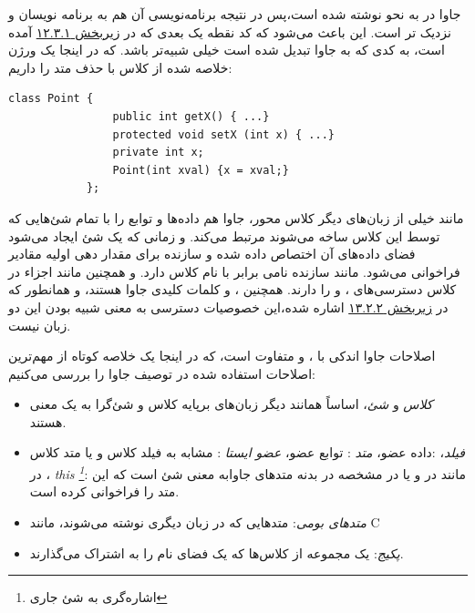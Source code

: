 \documentclass[a4paper,12pt]{report}
\newcommand{\lrm}[1]{{\color{steelBlue}\lr{\texttt{#1}}}}
\begin{document}
 	جاوا در به نحو 
 	نوشته شده است،‌پس در نتیجه برنامه‌نویسی آن هم به برنامه نویسان 
 	 و 
 	نزدیک تر است. این باعث می‌شود که کد نقطه یک بعدی که در 
 	\hyperref[subsec1:sec3:chap12]{
	زیربخش ۱۲.۳.۱} آمده است، به کدی که به جاوا تبدیل شده است خیلی شبیه‌تر باشد. که در اینجا یک ورژن خلاصه شده از کلاس با حذف متد 
 	را داریم:
 		
	\begin{latin}
		\small
		\begin{lstlisting}[]
			class Point {
				public int getX() { ...}
				protected void setX (int x) { ...}
				private int x;
				Point(int xval) {x = xval;}
			};		
		\end{lstlisting}
	\end{latin}	
			
	مانند خیلی از زبان‌های دیگر کلاس محور، جاوا هم داده‌ها و توابع را با تمام شئ‌هایی که توسط این کلاس ساخه می‌شوند مرتبط می‌کند. و زمانی که یک شئ ایجاد می‌شود فضای داده‌های آن اختصاص داده شده و سازنده برای مقدار دهی اولیه مقادیر فراخوانی می‌شود. مانند 
	سازنده نامی برابر با نام  کلاس دارد. و همچنین مانند 
	اجزاء در کلاس 
	 ‌دسترسی‌های
	،  و 
	 را دارند.
	  همچنین
	،  و 
		کلمات کلیدی جاوا هستند، و همانطور که در 
	\linebreak\hyperref[subsec2:sec2:chap13]{زیربخش ۱۳.۲.۲} 
اشاره شده،‌این خصوصیات دسترسی به معنی شبیه بودن این دو زبان نیست.

	اصلاحات جاوا اندکی با
	،  و 
	متفاوت است، که در اینجا یک خلاصه کوتاه از مهم‌ترین اصلاحات استفاده شده در توصیف جاوا را بررسی می‌کنیم:
	
	
	\begin{itemize}[nosep]
		\renewcommand{\labelitemi}{\color{gray}\scriptsize$\blacksquare$}
		\item \textit{
		کلاس} و \textit{شئ}، اساساً همانند دیگر زبان‌های برپایه کلاس و شئ‌گرا به یک معنی هستند.
		
		\item \textit{
		فیلد}،
		:داده عضو،
		\textit{
		متد
		}: توابع عضو، 
		\textit{
		عضو ایستا
		}
		: مشابه به فیلد کلاس و یا متد کلاس در 
		 ،
		\textit{
		this \footnote{
		اشاره‌گری به شئ جاری}}: مانند 
		\lrm{this} در  
		و یا 
		\lrm{self} در  
		مشخصه
		 \lrm{this}
		  در بدنه متد‌های جاوابه معنی شئ است که این متد را فراخوانی کرده است.
		\item \textit{
		متدهای بومی}: متدهایی که در زبان دیگری نوشته می‌شوند، مانند C
		\item \textit{
		پکیج‌}: یک مجموعه از کلاس‌ها که یک فضای نام را به اشتراک می‌گذارند.
	\end{itemize}
\end{document}
